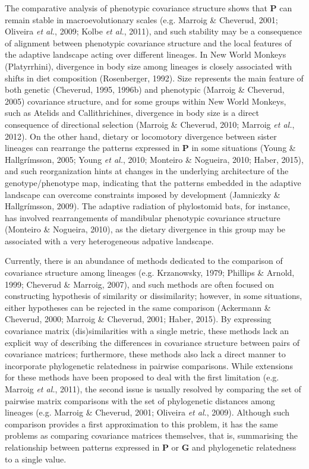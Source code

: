 \documentclass[12pt,twoside]{report}
\begin{document}
The comparative analysis of phenotypic covariance structure shows that
$\mathbf{P}$ can remain stable in macroevolutionary scales (e.g. Marroig
\& Cheverud, 2001; Oliveira \emph{et al.}, 2009; Kolbe \emph{et al.},
2011), and such stability may be a consequence of alignment between
phenotypic covariance structure and the local features of the adaptive
landscape acting over different lineages. In New World Monkeys
(Platyrrhini), divergence in body size among lineages is closely
associated with shifts in diet composition (Rosenberger, 1992). Size
represents the main feature of both genetic (Cheverud, 1995, 1996b) and
phenotypic (Marroig \& Cheverud, 2005) covariance structure, and for
some groups within New World Monkeys, such as Atelids and
Callithrichines, divergence in body size is a direct consequence of
directional selection (Marroig \& Cheverud, 2010; Marroig \emph{et al.},
2012). On the other hand, dietary or locomotory divergence between
sister lineages can rearrange the patterns expressed in $\mathbf{P}$ in
some situations (Young \& Hallgrímsson, 2005; Young \emph{et al.}, 2010;
Monteiro \& Nogueira, 2010; Haber, 2015), and such reorganization hints
at changes in the underlying architecture of the genotype/phenotype map,
indicating that the patterns embedded in the adaptive landscape can
overcome constraints imposed by development (Jamniczky \& Hallgrímsson,
2009). The adaptive radiation of phylostomid bats, for instance, has
involved rearrangements of mandibular phenotypic covariance structure
(Monteiro \& Nogueira, 2010), as the dietary divergence in this group
may be associated with a very heterogeneous adpative landscape.

Currently, there is an abundance of methods dedicated to the comparison
of covariance structure among lineages (e.g. Krzanowsky, 1979; Phillips
\& Arnold, 1999; Cheverud \& Marroig, 2007), and such methods are often
focused on constructing hypothesis of similarity or dissimilarity;
however, in some situations, either hypotheses can be rejected in the
same comparison (Ackermann \& Cheverud, 2000; Marroig \& Cheverud, 2001;
Haber, 2015). By expressing covariance matrix (dis)similarities with a
single metric, these methods lack an explicit way of describing the
differences in covariance structure between pairs of covariance
matrices; furthermore, these methods also lack a direct manner to
incorporate phylogenetic relatedness in pairwise comparisons. While
extensions for these methods have been proposed to deal with the first
limitation (e.g. Marroig \emph{et al.}, 2011), the second issue is
usually resolved by comparing the set of pairwise matrix comparisons
with the set of phylogenetic distances among lineages (e.g. Marroig \&
Cheverud, 2001; Oliveira \emph{et al.}, 2009). Although such comparison
provides a first approximation to this problem, it has the same problems
as comparing covariance matrices themselves, that is, summarising the
relationship between patterns expressed in $\mathbf{P}$ or $\mathbf{G}$
and phylogenetic relatedness to a single value.
\end{document}
